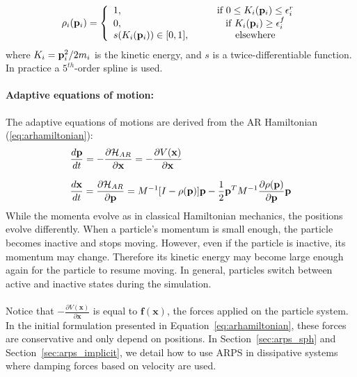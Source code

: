 \begin{equation}
    \label{eq:restrainingfunction}
    \rho_{i}(\mathbf{p}_{i}) =
    \displaystyle\left\lbrace
    \begin{array}{lccc}
        1, & & & \textrm{if } 0 \leq K_{i}(\mathbf{p}_{i}) \leq \epsilon_{i}^{r} \\
        0, & & & \textrm{if } K_{i}(\mathbf{p}_{i}) \geq \epsilon_{i}^{f} \\
        s(K_{i}(\mathbf{p}_{i})) \in [0, 1], & & & \textrm{elsewhere} \\
    \end{array}
    \right.
\end{equation}
where $K_i=\mathbf{p}_{i}^2/2m_{i}$ is the kinetic energy, and
$s$ is a twice-differentiable function. In practice a $5^{th}$-order spline is used.
\paragraph*{Adaptive equations of motion:}
The adaptive equations of motions are derived from the AR Hamiltonian (\ref{eq:arhamiltonian}):
\begin{equation}
   \label{eq:armotionequation}
    \displaystyle
    \begin{array}{l}
        \displaystyle \frac{d\mathbf{p}}{dt} =
        -\frac{\partial \mathcal{H}_{AR}}{\partial \mathbf{x}} = -\frac{\partial V(\mathbf{x})}{\partial \mathbf{x}}\\ \\
        \displaystyle \frac{d\mathbf{x}}{dt} =
       \frac{\partial \mathcal{H}_{AR}}{\partial \mathbf{p}} = M^{-1}[I - \rho(\mathbf{p})] \mathbf{p}
        - \frac{1}{2}\mathbf{p}^{T}M^{-1}\frac{\partial \rho(\mathbf{p})}{\partial \mathbf{p}}\mathbf{p}\\
    \end{array}
\end{equation}
While the momenta evolve as in classical Hamiltonian mechanics, the positions evolve differently.
When a particle's momentum is small enough, the particle becomes inactive and stops moving.
However, even if the particle is inactive, its momentum may change.
Therefore its kinetic energy may become large enough again for the particle to resume moving.
In general, particles switch between active and inactive states during the simulation.
\paragraph*{}
Notice that $\displaystyle -\frac{\partial V(\mathbf{x})}{\partial \mathbf{x}}$ is equal to $\mathbf{f}(\mathbf{x})$, the forces applied on the particle system. In the initial formulation presented in Equation~\ref{eq:arhamiltonian}, these forces are conservative and only depend on positions. In Section~\ref{sec:arps_sph} and Section~\ref{sec:arps_implicit}, we detail how to use ARPS in dissipative systems where damping forces based on velocity are used.
